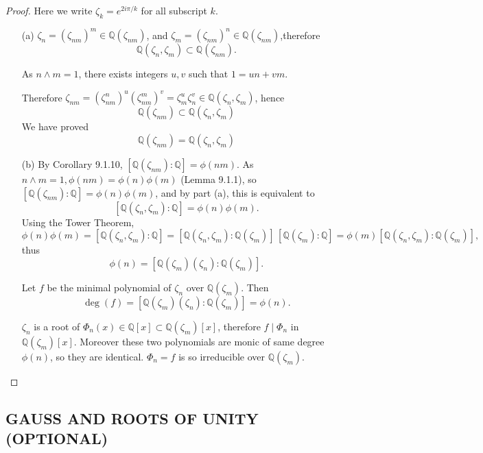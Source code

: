 \documentclass[11pt,a4paper]{article}
\newcommand{\Q}{\mathbb{Q}}
\begin{document}
\begin{proof}
Here we write $\zeta_k = e^{2i\pi/k}$ for all subscript $k$.
\begin{enumerate} 
\item[(a)]
$\zeta_n = (\zeta_{nm})^m \in \Q(\zeta_{nm})$, and $\zeta_m = (\zeta_{nm})^n \in \Q(\zeta_{nm})$,therefore
$$\Q(\zeta_n,\zeta_m) \subset \Q(\zeta_{nm}).$$

As $n\wedge m = 1$, there exists integers $u,v$ such that $1=un+vm$.

Therefore $\zeta_{nm} = (\zeta_{nm}^n)^u (\zeta_{nm}^m)^v = \zeta_m^u \zeta_n^v \in \Q(\zeta_n,\zeta_m)$, hence
$$\Q(\zeta_{nm})\subset\Q(\zeta_n,\zeta_m)$$ 
We have proved
$$\Q(\zeta_{nm})=\Q(\zeta_n,\zeta_m)$$ 


\begin{center}
\end{center}


\item[(b)]
By Corollary 9.1.10, $[\Q(\zeta_{nm}): \Q] = \phi(nm)$. As $n \wedge m=1, \phi(nm) = \phi(n) \phi(m)$ (Lemma 9.1.1), so
$[\Q(\zeta_{nm}) : \Q] = \phi(n)\phi(m)$, and by part (a), this is equivalent to
$$[\Q(\zeta_n, \zeta_m) : \Q] = \phi(n)\phi(m).$$
Using the Tower Theorem,  
$$\phi(n)\phi(m) = [\Q(\zeta_n, \zeta_m) : \Q] = [\Q(\zeta_n, \zeta_m) : \Q(\zeta_m)]\, [\Q( \zeta_m) : \Q] = \phi(m)[\Q(\zeta_n, \zeta_m) : \Q(\zeta_m)] ,$$thus
$$\phi(n) = [\Q(\zeta_m)( \zeta_n) : \Q(\zeta_m)] .$$

Let $f$ be the minimal polynomial of $\zeta_n$ over $\Q(\zeta_m)$. Then $$\deg(f) = [\Q(\zeta_m)( \zeta_n) : \Q(\zeta_m)] = \phi(n).$$

$\zeta_n$ is a root of $\Phi_n(x)\in \Q[x] \subset \Q(\zeta_m)[x]$, therefore $f \mid \Phi_n$ in $\Q(\zeta_m)[x]$. Moreover these two polynomials are monic of same degree $\phi(n)$, so they are identical. $\Phi_n = f$ is so irreducible over $\Q(\zeta_m)$.
\end{enumerate}
\end{proof}

\subsection{GAUSS AND ROOTS OF UNITY (OPTIONAL)}
\end{document}
